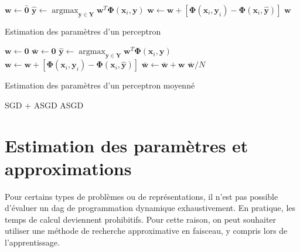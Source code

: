 \documentclass[11pt,openany]{book}
\newcommand{\ac}[1]{{\sc #1}} %
\begin{document}
\begin{algorithm}[htbp]
\begin{algorithmic}[1]
\State $\mathbf{w} \gets \bar{\mathbf{0}}$
\State
$\hat{\mathbf{y}} \gets \mathop{\text{argmax}}_{\mathbf{y}\in \mathbf{Y}} \mathbf{w}^T \boldsymbol\Phi(\mathbf{x}_i,\mathbf{y})$
\label{algoline-pseudoargmax}
     \State $\mathbf{w} \gets  \mathbf{w} +
     \left[\boldsymbol\Phi(\mathbf{x}_i,\mathbf{y}_i) 
       - \boldsymbol\Phi(\mathbf{x}_i,\hat{\mathbf{y}})  \right]$ 
     \label{algoline-update}
\EndIf
\EndFor
\EndFor
\State \Return $\mathbf{w}$
\EndFunction
\end{algorithmic}
\caption{\label{algo-perceptron-train}Estimation des paramètres d'un
  perceptron}
\end{algorithm}


\begin{algorithm}[htbp]
\begin{algorithmic}[1]
\State $\mathbf{w} \gets \mathbf{0}$
\State $\bar{\mathbf{w}} \gets \mathbf{0}$
\State $\hat{\mathbf{y}} \gets \mathop{\text{argmax}}_{\mathbf{y}\in \mathbf{Y}} \mathbf{w}^T \boldsymbol\Phi(\mathbf{x}_i,\mathbf{y})$
     \State $\mathbf{w} \gets  \mathbf{w} +
     \left[\boldsymbol\Phi(\mathbf{x}_i,\mathbf{y}_i) 
       - \boldsymbol\Phi(\mathbf{x}_i,\hat{\mathbf{y}})  \right]$ 
\EndIf
\State $\bar{\mathbf{w}} \gets \bar{\mathbf{w}}+\mathbf{w}$
\EndFor
\EndFor
\State \Return $\bar{\mathbf{w}}/N$
\EndFunction
\end{algorithmic}
\caption{\label{algo-perceptron-train-avg}Estimation des paramètres d'un
  perceptron moyenné}
\end{algorithm}

SGD + ASGD
ASGD

\section{Estimation des paramètres et approximations}

Pour certains types de problèmes ou de représentations, il n'est pas
possible d'évaluer un \ac{dag} de programmation dynamique exhaustivement.
En pratique, les temps de calcul deviennent prohibitifs.
Pour cette raison, on peut souhaiter utiliser une méthode de recherche
approximative en faisceau, y compris lors de l'apprentissage.
\end{document}

